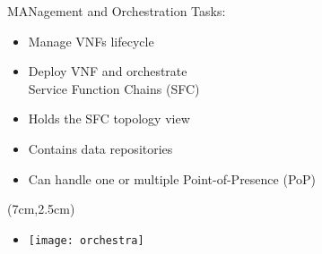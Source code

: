 \begin{frame}{MANagement and Orchestration}
  Tasks:
  \begin{itemize}
  \item<1-> Manage VNFs lifecycle
  \item<2-> Deploy VNF and orchestrate\\ Service Function Chains (SFC)
  \item<3-> Holds the SFC topology view
  \item<4-> Contains data repositories
  \item<5-> Can handle one or multiple Point-of-Presence (PoP)
  \end{itemize}

  \begin{textblock*}{5cm}(7cm,2.5cm)
    \begin{itemize}
    \item[] \texttt{[image: orchestra]}
    \end{itemize}
  \end{textblock*}
\end{frame}

